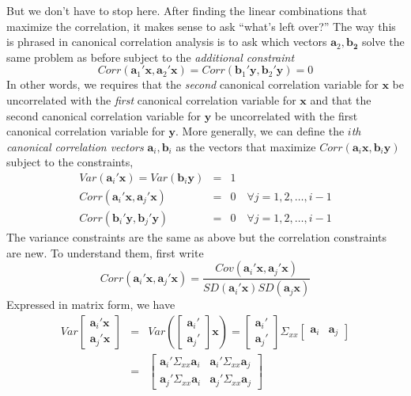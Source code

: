\documentclass[12pt]{article}
\theoremstyle{definition}
\begin{document}
But we don't have to stop here. After finding the linear combinations that maximize the correlation, it makes sense to ask ``what's left over?'' The way this is phrased in canonical correlation analysis is to ask which vectors $\mathbf{a}_2, \mathbf{b_2}$ solve the same problem as before subject to the \emph{additional constraint} 
  $$Corr(\mathbf{a}_1' \mathbf{x}, \mathbf{a}_2' \mathbf{x}) = Corr(\mathbf{b}_1' \mathbf{y}, \mathbf{b}_2' \mathbf{y}) =0$$
In other words, we requires that the \emph{second} canonical correlation variable for $\mathbf{x}$ be uncorrelated with the \emph{first} canonical correlation variable for $\mathbf{x}$ and that the second canonical correlation variable for $\mathbf{y}$ be uncorrelated with the first canonical correlation variable for $\mathbf{y}$. More generally, we can define the \emph{$i$th canonical correlation vectors} $\mathbf{a}_i, \mathbf{b}_i$ as the vectors that maximize $Corr(\mathbf{a}_i \mathbf{x}, \mathbf{b}_i \mathbf{y})$ subject to the constraints,
  \begin{eqnarray*}
    Var(\mathbf{a}_i' \mathbf{x}) = Var(\mathbf{b}_i \mathbf{y}) &=& 1 \\
    Corr(\mathbf{a}_i' \mathbf{x}, \mathbf{a}_j' \mathbf{x}) &=& 0 \quad \forall j = 1, 2, \hdots, i-1\\
    Corr(\mathbf{b}_i' \mathbf{y}, \mathbf{b}_j' \mathbf{y}) &=& 0 \quad \forall j = 1, 2, \hdots, i-1
  \end{eqnarray*}
The variance constraints are the same as above but the correlation constraints are new. To understand them, first write
$$Corr(\mathbf{a}_i' \mathbf{x}, \mathbf{a}_j' \mathbf{x}) = \frac{Cov(\mathbf{a}_i' \mathbf{x}, \mathbf{a}_j' \mathbf{x})}{SD(\mathbf{a}_i'\mathbf{x}) SD(\mathbf{a}_j \mathbf{x})}$$
Expressed in matrix form, we have
  \begin{eqnarray*}
    Var\left[\begin{array}
      {c} \mathbf{a}_i'\mathbf{x} \\ \mathbf{a}_j'\mathbf{x}
    \end{array} \right] &=& Var\left(\left[ \begin{array}
      {c} \mathbf{a}_i' \\ \mathbf{a}_j'
    \end{array}\right] \mathbf{x}\right)= \left[ \begin{array}
      {c} \mathbf{a}_i' \\ \mathbf{a}_j'
    \end{array}\right] \Sigma_{xx}\left[ \begin{array}
      {cc} \mathbf{a}_i & \mathbf{a}_j
    \end{array}\right]\\
      &=& \left[ \begin{array}
        {cc} \mathbf{a}_i'\Sigma_{xx} \mathbf{a}_i & \mathbf{a}_i'\Sigma_{xx} \mathbf{a}_j\\
        \mathbf{a}_j' \Sigma_{xx}\mathbf{a}_i& \mathbf{a}_j' \Sigma_{xx} \mathbf{a}_j
      \end{array}\right]
  \end{eqnarray*}
\end{document}
